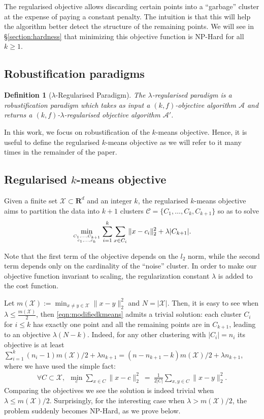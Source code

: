 \documentclass[12pt]{article}
\newcommand{\mc}{\mathcal}
\newcommand{\mb}{\mathbf}
\newtheorem{definition}[theorem]{Definition}
\begin{document}
The regularised objective allows discarding certain points into a ``garbage'' cluster at the expense of paying a constant penalty. The intuition is that this will help the algorithm better detect the structure of the remaining points. We will see in \S \ref{section:hardness} that minimizing this objective function is NP-Hard for all $k \ge 1$.

\subsection{Robustification paradigms}
\begin{definition}[$\lambda$-Regularised Paradigm] The $\lambda$-regularised paradigm is a robustification paradigm which takes as input a $(k, f)$-objective algorithm $\mc A$ and returns a $(k, f)$-$\lambda$-regularised objective algorithm $\mc A'$.  
\end{definition}

In this work, we focus on robustification of the $k$-means objective. Hence, it is useful to define the regularised $k$-means objective as we will refer to it many times in the remainder of the paper. 

\subsection{Regularised $k$-means objective}
Given a finite set $\mc X \subset \mb R^{d}$ and an integer $k$, the regularised $k$-means objective aims to partition the data into $k+1$ clusters $\mc C = \{C_1, \ldots, C_{k}, C_{k+1}\}$ so as to solve 
\begin{align}
	\min_{C_1,\ldots, C_{k+1} \atop c_1, \ldots, c_k} \sum_{i=1}^k \sum_{x \in C_i} \|x-c_i\|_2^2 + \lambda |C_{k+1}|.
	\label{eqn:modifiedkmeans}
\end{align}

Note that the first term of the objective depends on the $l_2$ norm, while the second term depends only on the cardinality of the ``noise'' cluster. In order to make our objective function invariant to scaling, the regularization constant $\lambda$ is added to the cost function. 

Let $m(\mc X) := \min_{x\ne y \in \mc X} \|x-y\|_2^2$ and $N = |\mc X|$. Then, it is easy to see when $\lambda \leq \frac{m(\mc X)}{2}$, then \eqref{eqn:modifiedkmeans} admits a trivial solution: each cluster $C_i$ for $i \leq k$ has exactly one point and all the remaining points are in $C_{k+1}$, leading to an objective $\lambda (N-k)$. Indeed, for any other clustering with $|C_i| = n_i$ its objective is at least $\sum_{i=1}^k (n_i-1) m(\mc X)/2 + \lambda n_{k+1} = (n-n_{k+1} - k) m(\mc X)/2 + \lambda n_{k+1}$, where we have used the simple fact:
\begin{align}
\forall C \subset \mc X, ~~
\min_{c} \sum_{x \in C} \|x - c\|_2^2 ~=~ \frac{1}{2|C|}\sum_{x, y \in C} \|x - y\|_2^2.
\end{align}
Comparing the objectives we see the solution is indeed trivial when $\lambda \leq m(\mc X) /2$. Surprisingly, for the interesting case when $\lambda > m(\mc X) /2$, the problem suddenly becomes NP-Hard, as we prove below.
\end{document}
